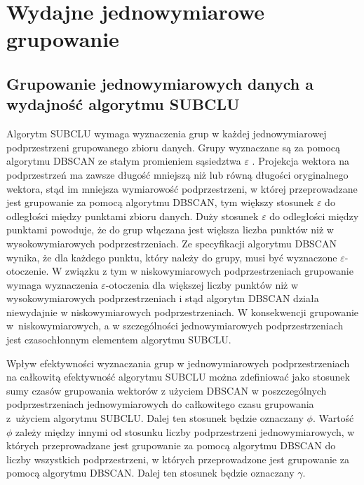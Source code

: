 \section{Wydajne jednowymiarowe grupowanie}
\subsection{Grupowanie jednowymiarowych danych a wydajność algorytmu SUBCLU}
Algorytm SUBCLU wymaga wyznaczenia grup w każdej jednowymiarowej podprzestrzeni grupowanego zbioru danych. Grupy wyznaczane są za pomocą algorytmu DBSCAN ze stałym promieniem sąsiedztwa $\varepsilon$ . Projekcja wektora na podprzestrzeń ma zawsze długość mniejszą niż lub równą długości oryginalnego wektora, stąd im mniejsza wymiarowość podprzestrzeni, w której przeprowadzane jest grupowanie za pomocą algorytmu DBSCAN, tym większy stosunek $\varepsilon$ do odległości między punktami zbioru danych. Duży stosunek $\varepsilon$ do odległości między punktami powoduje, że do grup włączana jest większa liczba punktów niż w wysokowymiarowych podprzestrzeniach. Ze specyfikacji algorytmu DBSCAN wynika, że dla każdego punktu, który należy do grupy, musi być wyznaczone $ \varepsilon $-otoczenie. W związku z tym w niskowymiarowych podprzestrzeniach grupowanie wymaga wyznaczenia $ \varepsilon $-otoczenia dla większej liczby punktów niż w wysokowymiarowych podprzestrzeniach i stąd algorytm DBSCAN działa niewydajnie w niskowymiarowych podprzestrzeniach. W konsekwencji grupowanie \mbox{w niskowymiarowych}, a w szczególności jednowymiarowych podprzestrzeniach jest czasochłonnym elementem algorytmu SUBCLU.\par

Wpływ efektywności wyznaczania grup w jednowymiarowych podprzestrzeniach na całkowitą efektywność algorytmu SUBCLU można zdefiniować jako stosunek sumy czasów grupowania wektorów z użyciem DBSCAN w poszczególnych podprzestrzeniach jednowymiarowych do całkowitego czasu grupowania \mbox{z użyciem} algorytmu SUBCLU. Dalej ten stosunek będzie oznaczany $ \phi $. Wartość $ \phi $ zależy między innymi od stosunku liczby podprzestrzeni jednowymiarowych, w których przeprowadzane jest grupowanie za pomocą algorytmu DBSCAN do liczby wszystkich podprzestrzeni, w których przeprowadzone jest grupowanie za pomocą algorytmu DBSCAN. Dalej ten stosunek będzie oznaczany $ \gamma $.\par

